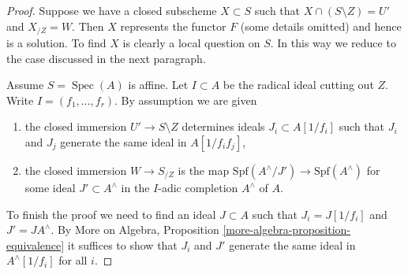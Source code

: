\documentclass[10pt,a4paper]{amsart}
\theoremstyle{plain}
\theoremstyle{definition}
\theoremstyle{remark}
\numberwithin{equation}{subsection}
\def\Spec{\mathop{\mathrm{Spec}}}
\begin{document}
\begin{proof}
Suppose we have a closed subscheme $X \subset S$ such that
$X \cap (S \setminus Z) = U'$ and $X_{/Z} = W$. Then
$X$ represents the functor $F$ (some details omitted) and hence 
is a solution. To find $X$ is clearly a local question on $S$.
In this way we reduce to the case discussed in the next paragraph.

\medskip\noindent
Assume $S = \Spec(A)$ is affine. Let $I \subset A$ be the
radical ideal cutting out $Z$.
Write $I = (f_1, \ldots, f_r)$. By assumption we are given
\begin{enumerate}
\item the closed immersion $U' \to S \setminus Z$ determines
ideals $J_i \subset A[1/f_i]$ such that $J_i$ and $J_j$
generate the same ideal in $A[1/f_if_j]$,
\item the closed immersion $W \to S_{/Z}$ is the map
$\text{Spf}(A^\wedge/J') \to \text{Spf}(A^\wedge)$ for some
ideal $J' \subset A^\wedge$ in the $I$-adic completion $A^\wedge$ of $A$.
\end{enumerate}
To finish the proof we need to find an ideal $J \subset A$
such that $J_i = J[1/f_i]$ and $J' = JA^\wedge$. By
More on Algebra, Proposition \ref{more-algebra-proposition-equivalence}
it suffices to show that $J_i$ and $J'$ generate the same ideal
in $A^\wedge[1/f_i]$ for all $i$.


\end{proof}
\end{document}
